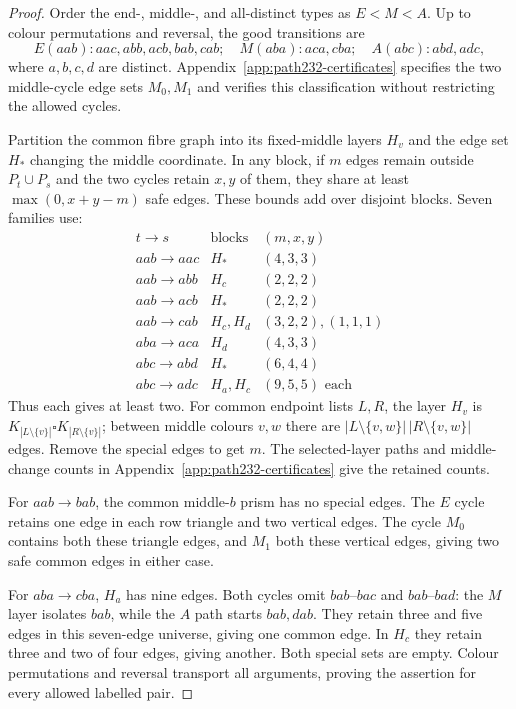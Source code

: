 \begin{proof}
Order the end-, middle-, and all-distinct types as $E<M<A$.
Up to colour permutations and reversal, the good transitions are
\[
E(aab):aac,abb,acb,bab,cab;\quad
M(aba):aca,cba;\quad A(abc):abd,adc,
\]
where $a,b,c,d$ are distinct. Appendix~\ref{app:path232-certificates}
specifies the two middle-cycle edge sets $M_0,M_1$ and verifies this
classification without restricting the allowed cycles.

Partition the common fibre graph into its fixed-middle layers $H_v$
and the edge set $H_*$ changing the middle coordinate. In any block,
if $m$ edges remain outside $P_t\cup P_s$ and the two cycles retain
$x,y$ of them, they share at least $\max(0,x+y-m)$ safe edges.
These bounds add over disjoint blocks. Seven families use:
\[
\begin{array}{c|c|c}
t\to s&\text{blocks}&(m,x,y)\\\hline
aab\to aac&H_*&(4,3,3)\\
aab\to abb&H_c&(2,2,2)\\
aab\to acb&H_*&(2,2,2)\\
aab\to cab&H_c,H_d&(3,2,2),(1,1,1)\\
aba\to aca&H_d&(4,3,3)\\
abc\to abd&H_*&(6,4,4)\\
abc\to adc&H_a,H_c&(9,5,5)\text{ each}
\end{array}
\]
Thus each gives at least two. For common endpoint lists $L,R$, the
layer $H_v$ is $K_{|L\setminus\{v\}|}\square K_{|R\setminus\{v\}|}$;
between middle colours $v,w$ there are
$|L\setminus\{v,w\}|\,|R\setminus\{v,w\}|$ edges.
Remove the special edges to get $m$. The selected-layer paths and middle-change counts
in Appendix~\ref{app:path232-certificates} give the retained counts.

For $aab\to bab$, the common middle-$b$ prism has no special edges.
The $E$ cycle retains one edge in each row triangle and two vertical
edges. The cycle $M_0$ contains both these triangle edges, and $M_1$
both these vertical edges, giving two safe common edges in either case.

For $aba\to cba$, $H_a$ has nine edges. Both cycles omit
$bab$--$bac$ and $bab$--$bad$: the $M$ layer isolates $bab$, while
the $A$ path starts $bab,dab$. They retain three and five edges in
this seven-edge universe, giving one common edge. In $H_c$ they
retain three and two of four edges, giving another. Both special
sets are empty. Colour permutations and reversal transport all
arguments, proving the assertion for every allowed labelled pair.
\end{proof}

